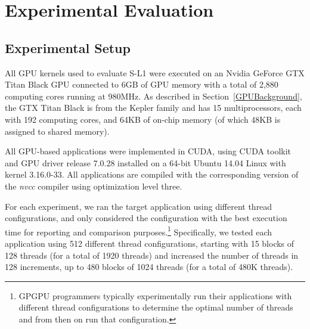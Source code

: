\section{Experimental Evaluation}\label{sec:results}

\subsection{Experimental Setup}
\label{sec:expSetup}

All GPU kernels used to evaluate S-L1 were executed on an Nvidia GeForce GTX Titan Black GPU connected to 6GB of GPU memory with a total of 2,880 computing cores running at 980MHz.
As described in Section~\ref{GPUBackground}, the GTX Titan Black is from the Kepler family and has 15
multiprocessors, each with 192 computing cores,  and 64KB of on-chip memory (of which 48KB is assigned to shared memory).

All GPU-based applications were implemented in CUDA, using CUDA toolkit and GPU driver release 7.0.28 installed on a 64-bit Ubuntu 14.04 Linux with kernel 3.16.0-33.
All applications are compiled with the corresponding version of the {\it nvcc} compiler using optimization level three.

For each experiment, we ran the target application using different thread configurations,
and only considered the configuration with the best execution time for reporting and comparison purposes.\footnote{ 
    GPGPU programmers typically experimentally run their applications  with different thread configurations to
    determine the optimal number of threads and from then on run that configuration.}
Specifically, we tested each application using 512 different thread configurations,
starting with 15 blocks of 128 threads (for a total of 1920 threads) and increased the number of threads in 128 increments, up to 480 blocks of 1024 threads (for a total of 480K threads).

